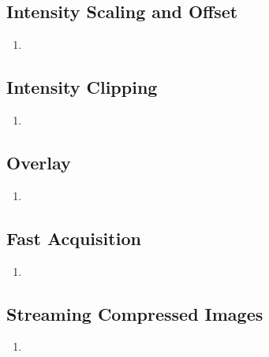\documentclass[openany]{article}
\begin{document}
    \subsection{Intensity Scaling and Offset}\label{sec:scaling}

        \begin{enumerate}
            \item \textbf{}
        \end{enumerate}

    \subsection{Intensity Clipping}\label{sec:clipping}

        \begin{enumerate}
            \item \textbf{}
        \end{enumerate}

    \subsection{Overlay}\label{sec:overlay}

        \begin{enumerate}
            \item \textbf{}
        \end{enumerate}

    \subsection{Fast Acquisition}\label{sec:fast-acq}

        \begin{enumerate}
            \item \textbf{}
        \end{enumerate}

    \subsection{Streaming Compressed Images}\label{sec:compressed-img}

        \begin{enumerate}
            \item \textbf{}
        \end{enumerate}
\end{document}
